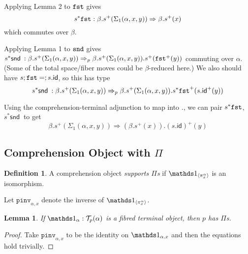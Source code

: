 \documentclass[10pt]{article}
\newtheorem{lemma}{Lemma}
\theoremstyle{definition}
\newtheorem{definition}{Definition}
\newcommand\dsd[1]{\ensuremath{\mathsf{#1}}}
\newcommand{\tcell}{\Rightarrow}
\newcommand{\app}[2]{\ensuremath{#1 \: #2}}
\newcommand{\snd}[1]{\app{\dsd{snd}}{#1}}
\newcommand{\id}{\mathsf{id}}
\newcommand\TrPlus[2]{\ensuremath{{#1}^+(#2)}}
\newcommand\El[2]{\mathcal{T}_{#1}(#2)}
\begin{document}
\begin{enumerate}
  Applying Lemma 2 to $\mathtt{fst}$ gives
  \[s^*{\mtt{fst}} : \beta.\TrPlus{s}{\Sigma_1(\alpha,x,y)} \tcell \beta.\TrPlus{s}{x}
  \]
  which commutes over $\beta$.

  Applying Lemma 1 to $\mathtt{snd}$ gives $s^*{\snd{}} :
  \beta.\TrPlus{s}{\Sigma_1(\alpha,x,y)} \tcell_p
  \beta.\TrPlus{s}{\Sigma_1(\alpha,x,y)}.\TrPlus{s}{\TrPlus{\mtt{fst}}{y}}$
  commuting over $\alpha$.  (Some of the total space/fiber moves could
  be $\beta$-reduced here.)
  We also should have $s;\mtt{fst} = ;{s.\id}$, so this has type
  \[
  s^*{\snd{}} : \beta.\TrPlus{s}{\Sigma_1(\alpha,x,y)} \tcell_p
  \beta.\TrPlus{s}{\Sigma_1(\alpha,x,y)}.\TrPlus{s^*\mtt{fst}}{\TrPlus{s.\id}{y}}
  \]
  
  Using the comprehension-terminal adjunction to map into $.$, we can
  pair $s^*{\mathtt{fst}}$, $s^*{\snd{}}$
  to get
  \[
  \beta.\TrPlus{s}{\Sigma_1(\alpha,x,y)} \tcell (\beta.\TrPlus{s}{x}).{\TrPlus{(s.\id)}{y}}
  \]
  
\end{enumerate}

\subsection{Comprehension Object with $\Pi$}
\newcommand\pinv[1]{\ensuremath{\mathtt{pinv}_{#1}}}

\begin{definition}\label{def:supports-pis}
A comprehension object \emph{supports $\Pi$s} if $\ApOne{\pi^\alpha_x}$ is an isomorphism.
\end{definition}

Let $\pinv{\alpha,x}$ denote the inverse of $\ApOne{\pi^\alpha_x}$.

\begin{lemma}
If $\One_\alpha : \El{p}{\alpha}$ is a fibred terminal object, then $p$ has $\Pi$s.
\end{lemma}
\begin{proof}
Take $\pinv{\alpha,x}$ to be the identity on $\One_{\alpha.x}$ and then the equations hold trivially.
\end{proof}
\end{document}
